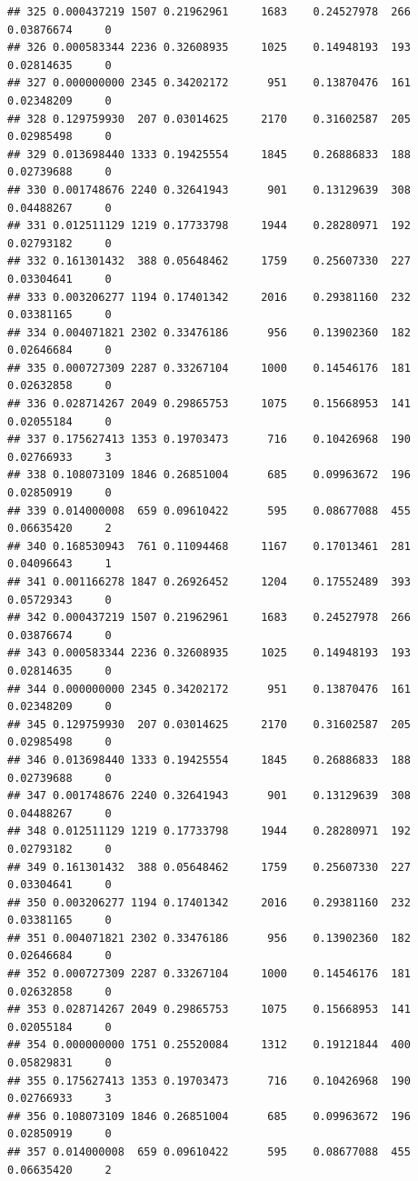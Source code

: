 \documentclass[
]{article}
\begin{document}
\begin{verbatim}
## 325 0.000437219 1507 0.21962961     1683    0.24527978  266 0.03876674     0
## 326 0.000583344 2236 0.32608935     1025    0.14948193  193 0.02814635     0
## 327 0.000000000 2345 0.34202172      951    0.13870476  161 0.02348209     0
## 328 0.129759930  207 0.03014625     2170    0.31602587  205 0.02985498     0
## 329 0.013698440 1333 0.19425554     1845    0.26886833  188 0.02739688     0
## 330 0.001748676 2240 0.32641943      901    0.13129639  308 0.04488267     0
## 331 0.012511129 1219 0.17733798     1944    0.28280971  192 0.02793182     0
## 332 0.161301432  388 0.05648462     1759    0.25607330  227 0.03304641     0
## 333 0.003206277 1194 0.17401342     2016    0.29381160  232 0.03381165     0
## 334 0.004071821 2302 0.33476186      956    0.13902360  182 0.02646684     0
## 335 0.000727309 2287 0.33267104     1000    0.14546176  181 0.02632858     0
## 336 0.028714267 2049 0.29865753     1075    0.15668953  141 0.02055184     0
## 337 0.175627413 1353 0.19703473      716    0.10426968  190 0.02766933     3
## 338 0.108073109 1846 0.26851004      685    0.09963672  196 0.02850919     0
## 339 0.014000008  659 0.09610422      595    0.08677088  455 0.06635420     2
## 340 0.168530943  761 0.11094468     1167    0.17013461  281 0.04096643     1
## 341 0.001166278 1847 0.26926452     1204    0.17552489  393 0.05729343     0
## 342 0.000437219 1507 0.21962961     1683    0.24527978  266 0.03876674     0
## 343 0.000583344 2236 0.32608935     1025    0.14948193  193 0.02814635     0
## 344 0.000000000 2345 0.34202172      951    0.13870476  161 0.02348209     0
## 345 0.129759930  207 0.03014625     2170    0.31602587  205 0.02985498     0
## 346 0.013698440 1333 0.19425554     1845    0.26886833  188 0.02739688     0
## 347 0.001748676 2240 0.32641943      901    0.13129639  308 0.04488267     0
## 348 0.012511129 1219 0.17733798     1944    0.28280971  192 0.02793182     0
## 349 0.161301432  388 0.05648462     1759    0.25607330  227 0.03304641     0
## 350 0.003206277 1194 0.17401342     2016    0.29381160  232 0.03381165     0
## 351 0.004071821 2302 0.33476186      956    0.13902360  182 0.02646684     0
## 352 0.000727309 2287 0.33267104     1000    0.14546176  181 0.02632858     0
## 353 0.028714267 2049 0.29865753     1075    0.15668953  141 0.02055184     0
## 354 0.000000000 1751 0.25520084     1312    0.19121844  400 0.05829831     0
## 355 0.175627413 1353 0.19703473      716    0.10426968  190 0.02766933     3
## 356 0.108073109 1846 0.26851004      685    0.09963672  196 0.02850919     0
## 357 0.014000008  659 0.09610422      595    0.08677088  455 0.06635420     2

\end{verbatim}
\end{document}
